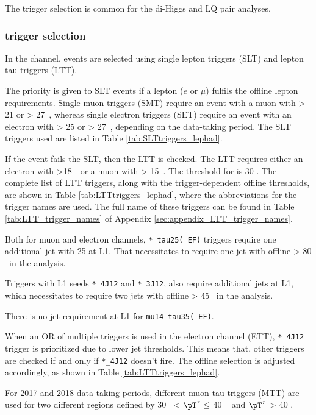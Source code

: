 The trigger selection is common for the di-Higgs and LQ pair analyses. 

\subsubsection{\lephad trigger selection}
\label{sec:lephadtrigger}
In the \lephad channel, events are selected using single lepton triggers (SLT) and lepton tau triggers (LTT). 

The priority is given to SLT events if a lepton ($e$ or $\mu$) fulfils the offline lepton \pT requirements.
Single muon triggers (SMT) require an event with a muon with \pT > 21 or > 27~\GeV, whereas single electron triggers (SET)
require an event with an electron with \pT > 25 or > 27~\GeV, depending on the data-taking period.
The SLT triggers used are listed in Table \ref{tab:SLTtriggers_lephad}. 

If the event fails the SLT, then the LTT is checked. The LTT requires either an electron with \pT >18~\GeV~or a
muon with \pT > 15~\GeV. The \pT threshold for \tauhad is 30 \GeV. The complete list of LTT triggers, along with the trigger-dependent offline \pT thresholds, are
shown in Table \ref{tab:LTTtriggers_lephad}, where the abbreviations for the trigger names are used.
The full name of these triggers can be found in Table \ref{tab:LTT_trigger_names} of Appendix \ref{sec:appendix_LTT_trigger_names}.

Both for muon and electron channels, \verb|*_tau25(_EF)| triggers require one additional jet with 25 \GeV at L1. 
That necessitates to require one jet with offline \pT > 80 \GeV~in the analysis.

Triggers with L1 seeds \verb|*_4J12| and \verb|*_3J12|, also require additional jets at L1,
which necessitates to require two jets with offline \pT > 45 \GeV~in the analysis.

There is no jet requirement at L1 for \verb|mu14_tau35(_EF)|. 

When an OR of multiple triggers is used in the electron channel (ETT), \verb|*_4J12| trigger is prioritized due to lower jet \pT thresholds. 
This means that, other triggers are checked if and only if  \verb|*_4J12| doesn't fire. The offline selection is adjusted accordingly, as shown in Table \ref{tab:LTTtriggers_lephad}.

For 2017 and 2018 data-taking periods, different muon tau triggers (MTT)
are used for two different regions defined by 30 \GeV~< $\pT^{\tau} \leq$ 40 \GeV~ and $\pT^{\tau}$ > 40 \GeV. 


